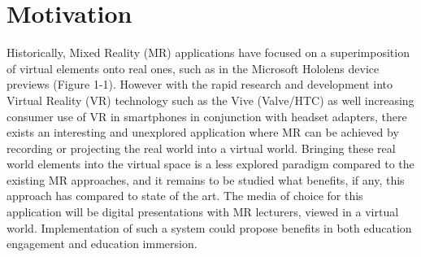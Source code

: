 \documentclass[11pt]{report}
\begin{document}
\section{Motivation}
Historically, Mixed Reality (MR) applications have focused on a superimposition of virtual elements onto real ones, such as in the Microsoft Hololens device previews (Figure 1-1). However with the rapid research and development into Virtual Reality (VR) technology such as the Vive (Valve/HTC) as well increasing consumer use of VR in smartphones in conjunction with headset adapters, there exists an interesting and unexplored application where MR can be achieved by recording or projecting the real world into a virtual world. Bringing these real world elements into the virtual space is a less explored paradigm compared to the existing MR approaches, and it remains to be studied what benefits, if any, this approach has compared to state of the art. The media of choice for this application will be digital presentations with MR lecturers, viewed in a virtual world. Implementation of such a system could propose benefits in both education engagement and education immersion.
\end{document}

